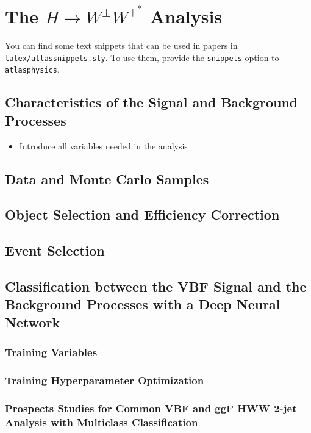 \chapter{The $H\rightarrow W^{\pm}W^{\mp^*}$ Analysis}
\label{chap:hww}

You can find some text snippets that can be used in papers in \texttt{latex/atlassnippets.sty}.
To use them, provide the \texttt{snippets} option to \texttt{atlasphysics}.

\section{Characteristics of the Signal and Background Processes}
\begin{itemize}
    \item Introduce all variables needed in the analysis
\end{itemize}

\section{Data and Monte Carlo Samples}


\section{Object Selection and Efficiency Correction}

\section{Event Selection}

\section{Classification between the VBF Signal and the Background Processes with a Deep Neural Network}
\subsection{Training Variables}
\subsection{Training Hyperparameter Optimization}
\subsection{Prospects Studies for Common VBF and ggF HWW 2-jet Analysis with Multiclass Classification}


